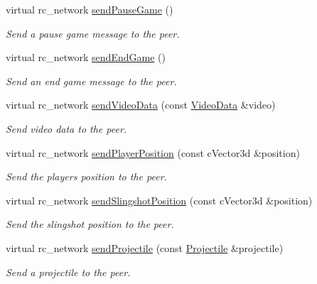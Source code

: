 \begin{DoxyCompactItemize}
virtual rc\_\-network \hyperlink{classWinsockNetwork_ae4412629d2ee052afc41c81f36cfad50}{sendPauseGame} ()
\begin{DoxyCompactList}\small\item\em Send a pause game message to the peer. \item\end{DoxyCompactList}\item 
virtual rc\_\-network \hyperlink{classWinsockNetwork_a877c8001bbd880295e0458c3377dca25}{sendEndGame} ()
\begin{DoxyCompactList}\small\item\em Send an end game message to the peer. \item\end{DoxyCompactList}\item 
virtual rc\_\-network \hyperlink{classWinsockNetwork_a36362dbaa70fbe00dd48fded21464888}{sendVideoData} (const \hyperlink{structVideoData}{VideoData} \&video)
\begin{DoxyCompactList}\small\item\em Send video data to the peer. \item\end{DoxyCompactList}\item 
virtual rc\_\-network \hyperlink{classWinsockNetwork_ab27dd7393a89573f9e75e1a50efbc833}{sendPlayerPosition} (const cVector3d \&position)
\begin{DoxyCompactList}\small\item\em Send the players position to the peer. \item\end{DoxyCompactList}\item 
virtual rc\_\-network \hyperlink{classWinsockNetwork_af0456294cf39244cc59f1ca81e2aa2d3}{sendSlingshotPosition} (const cVector3d \&position)
\begin{DoxyCompactList}\small\item\em Send the slingshot position to the peer. \item\end{DoxyCompactList}\item 
virtual rc\_\-network \hyperlink{classWinsockNetwork_accb610c314dd94a1649bcfe101c93997}{sendProjectile} (const \hyperlink{classProjectile}{Projectile} \&projectile)
\begin{DoxyCompactList}\small\item\em Send a projectile to the peer. \item\end{DoxyCompactList}\item 

\end{DoxyCompactItemize}
